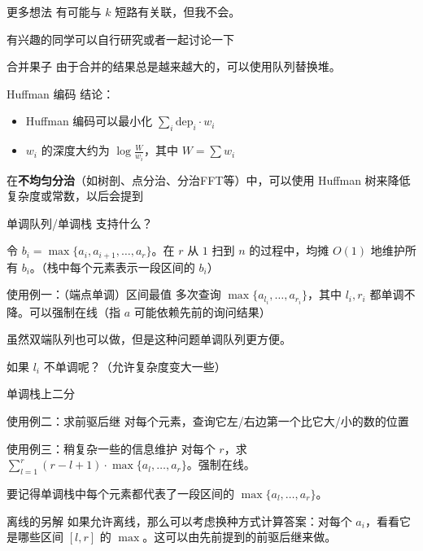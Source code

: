 \documentclass[11pt,aspectratio=169]{beamer}
\begin{document}
\begin{frame}{更多想法}
    有可能与 $k$ 短路有关联，但我不会。

    有兴趣的同学可以自行研究或者一起讨论一下
\end{frame}
\begin{frame}{合并果子}
    由于合并的结果总是越来越大的，可以使用队列替换堆。
\end{frame}
\begin{frame}{Huffman 编码}
    结论：

    \begin{itemize}
        \item Huffman 编码可以最小化 $\sum_i \mathrm{dep}_i\cdot w_i$
        \item $w_i$ 的深度大约为 $\log\frac{W}{w_i}$，其中 $W=\sum w_i$
    \end{itemize}

    在\textbf{不均匀分治}（如树剖、点分治、分治FFT等）中，可以使用 Huffman 树来降低复杂度或常数，以后会提到
\end{frame}
\begin{frame}{单调队列/单调栈}
    支持什么？

    令 $b_i=\max\{a_i,a_{i+1},\ldots,a_r\}$。在 $r$ 从 $1$ 扫到 $n$ 的过程中，均摊 $O(1)$ 地维护所有 $b_i$。（栈中每个元素表示一段区间的 $b_i$）
\end{frame}
\begin{frame}{使用例一：（端点单调）区间最值}
    多次查询 $\max\{a_{l_i},\ldots,a_{r_i}\}$，其中 $l_i,r_i$ 都单调不降。可以强制在线（指 $a$ 可能依赖先前的询问结果）

    虽然双端队列也可以做，但是这种问题单调队列更方便。

    如果 $l_i$ 不单调呢？（允许复杂度变大一些）
    
    单调栈上二分
\end{frame}
\begin{frame}{使用例二：求前驱后继}
    对每个元素，查询它左/右边第一个比它大/小的数的位置
\end{frame}
\begin{frame}{使用例三：稍复杂一些的信息维护}
    对每个 $r$，求 $\sum_{l=1}^r (r-l+1)\cdot \max\{a_l,\ldots,a_r\}$。强制在线。

    要记得单调栈中每个元素都代表了一段区间的 $\max\{a_l,\ldots,a_r\}$。
\end{frame}
\begin{frame}{离线的另解}
    如果允许离线，那么可以考虑换种方式计算答案：对每个 $a_i$，看看它是哪些区间 $[l,r]$ 的 $\max$。这可以由先前提到的前驱后继来做。
\end{frame}
\end{document}
